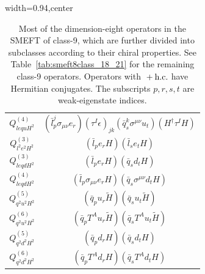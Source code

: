 \begin{table}[H]
\begin{center}
\begin{adjustbox}{width=0.94\textwidth,center}
\begin{minipage}[t]{6.2cm}
\begin{tabular}[t]{c|c}
%
$Q_{lequH^2}^{(4)}$  &  $(\bar l_p^j \sigma_{\mu\nu} e_r) (\tau^I\epsilon)_{jk} (\bar q_s^k \sigma^{\mu\nu} u_t) (H^\dag \tau^I H)$ \\
%
$Q_{l^2e^2H^2}^{(3)}$  &  $(\bar l_p e_r H) (\bar l_s e_t H)$ \\
%
$Q_{leqdH^2}^{(3)}$  &  $(\bar l_p e_r H) (\bar q_s d_t H)$ \\
%
$Q_{leqdH^2}^{(4)}$  &  $(\bar l_p \sigma_{\mu\nu} e_r H) (\bar q_s \sigma^{\mu\nu} d_t H)$ \\
%
$Q_{q^2u^2H^2}^{(5)}$  &  $(\bar q_p u_r \widetilde H) (\bar q_s u_t \widetilde H)$ \\
%
$Q_{q^2u^2H^2}^{(6)}$  &  $(\bar q_p T^A u_r \widetilde H) (\bar q_s T^A u_t \widetilde H)$ \\
%
$Q_{q^2d^2H^2}^{(5)}$  &  $(\bar q_p d_r H) (\bar q_s d_t H)$ \\
%
$Q_{q^2d^2H^2}^{(6)}$  &  $(\bar q_p T^A d_r H) (\bar q_s T^A d_t H)$
\end{tabular}
\end{minipage}
\end{adjustbox}
\end{center}
\caption{Most of the dimension-eight operators in the SMEFT of class-9, which are further divided into subclasses according to their chiral properties. 
See Table~\ref{tab:smeft8class_18_21} for the remaining class-9 operators.
Operators with ${}+\mathrm{h.c.}$ have Hermitian conjugates. 
The subscripts $p, r, s, t$ are weak-eigenstate indices.}
\label{tab:smeft8class_18}
\end{table}
